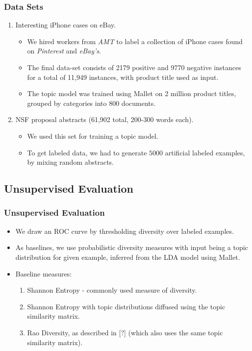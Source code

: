 \documentclass{beamer}
\begin{document}
\begin{frame}
\frametitle{Data Sets}
\begin{enumerate}
\item Interesting iPhone cases on eBay.
  \begin{itemize}
  \item We hired workers from {\em AMT} to label a collection
of iPhone cases found on {\em Pinterest} and {\em
  eBay's}.
\item The final data-set consists of 2179 positive and 9770 negative instances for
a total of 11,949 instances, with product title used as input. 
\item The topic model was trained using Mallet on 2 million product
  titles, grouped by categories into 800 documents.
\end{itemize}
\item NSF proposal abstracts (61,902 total, 200-300 words each).
\begin{itemize}
\item We used this set 
for training a topic model.
\item To get labeled data, we had to generate $5000$ artificial
  labeled examples, by mixing random abstracts. 
\end{itemize}
\end{enumerate}
\end{frame}

\subsection{Unsupervised Evaluation}

\begin{frame}
\frametitle{Unsupervised Evaluation}
\begin{itemize}
\item We draw an ROC curve by thresholding diversity
  over labeled examples. 
\item As baselines, we use probabilistic diversity
  measures with input being a topic distribution for  given example,
  inferred from the LDA model using Mallet.
\item Baseline measures:
\begin{enumerate}
\item Shannon Entropy - commonly used measure of diversity.
\item Shannon Entropy with topic distributions diffused using the topic
  similarity matrix. 
\item Rao Diversity, as described in [?] (which also uses the same
  topic similarity matrix). 
\end{enumerate}
\end{itemize}
\end{frame}
\end{document}
